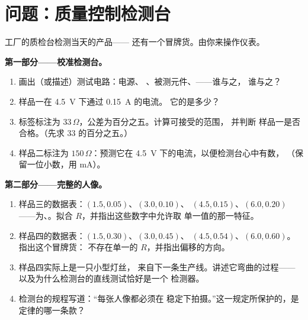 \section{问题：质量控制检测台}

\begin{problem}\label{pb:g8:ohms-law:1}
工厂的质检台检测当天的产品——
还有一个冒牌货。由你来操作仪表。

\medskip\noindent\textbf{第一部分——校准检测台。}
\begin{enumerate}
  \item 画出（或描述）测试电路：电源、
        、被测元件、——谁与之，
        谁与之？
  \item 样品一在 \qty{4.5}{V} 下通过 \qty{0.15}{A} 的电流。
        它的是多少？
  \item 标签标注为 $33\,\Omega$，公差为百分之五。计算可接受的范围，
        并判断
        样品一是否合格。（先求 $33$ 的百分之五。）
  \item 样品二标注为 $150\,\Omega$：预测它在
        \qty{4.5}{V} 下的电流，以便检测台心中有数，
        （保留一位小数，用 \unit{mA}）。
\end{enumerate}

\medskip\noindent\textbf{第二部分——完整的人像。}
\begin{enumerate}[resume]
  \item 样品三的数据表：$(1.5, 0.05)$、$(3.0, 0.10)$、
        $(4.5, 0.15)$、$(6.0, 0.20)$——为、。拟合
        $R$，并指出这些数字中允许取
        单一值的那一特征。
  \item 样品四的数据表：$(1.5, 0.30)$、$(3.0, 0.45)$、
        $(4.5, 0.54)$、$(6.0, 0.60)$。指出这个冒牌货：
        不存在单一的 $R$，并指出偏移的方向。
  \item 样品四实际上是一只小型灯丝，
        来自下一条生产线。讲述它弯曲的过程——
        以及为什么检测台的直线测试恰好是一个
        检测器。
  \item 检测台的规程写道：“每张人像都必须在
        稳定下拍摄。”这一规定所保护的，是
        定律的哪一条款？
\end{enumerate}


\end{problem}
